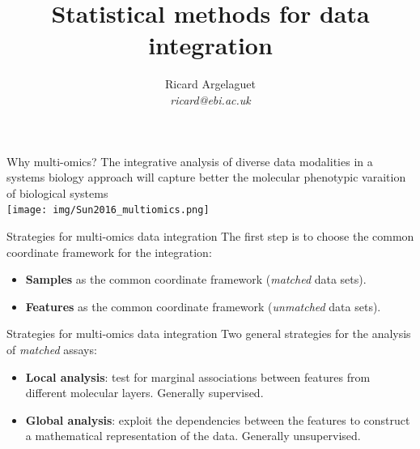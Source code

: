 \documentclass[aspectratio=169,notes]{beamer}
\title{Statistical methods for data integration}
\author{Ricard Argelaguet \\ \textit{ricard@ebi.ac.uk}}
\institute{European Bioinformatics Institute (EMBL-EBI) \\ University of Cambridge}
\begin{document}
	\begin{frame}
	\titlepage
	\end{frame}
	

	
	\begin{frame}{Why multi-omics?}
	The integrative analysis of diverse data modalities in a systems biology approach will capture better the molecular phenotypic varaition of biological systems\\
	\leavevmode\newline
	\centering
	\texttt{[image: img/Sun2016\_multiomics.png]}
	\end{frame}

	\begin{frame}{Strategies for multi-omics data integration}
	The first step is to choose the common coordinate framework for the integration:
	\begin{itemize}
		\item \textbf{Samples} as the common coordinate framework (\textit{matched} data sets).
		\item \textbf{Features} as the common coordinate framework (\textit{unmatched} data sets).
	\end{itemize}	
	\end{frame}


	\begin{frame}{Strategies for multi-omics data integration}
	Two general strategies for the analysis of \textit{matched} assays:
	\begin{itemize}
		\item \textbf{Local analysis}: test for marginal associations between features from different molecular layers. Generally supervised.
		\item \textbf{Global analysis}: exploit the dependencies between the features to construct a mathematical representation of the data. Generally unsupervised.
	\end{itemize}	
	\end{frame}
\end{document}
